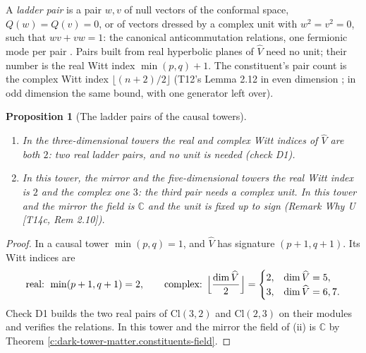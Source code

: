 \documentclass[11pt]{article}
\newtheorem{proposition}[theorem]{Proposition}
\theoremstyle{definition}
\theoremstyle{plain}
\newcommand{\changedmark}[2]{\marginpar{\raggedright\scriptsize\color{#1}#2}}
\providecommand{\C}{}\renewcommand{\C}{\mathbb{C}}
\providecommand{\Cl}{}\renewcommand{\Cl}{\mathrm{Cl}}
\providecommand{\hatV}{}\renewcommand{\hatV}{\widehat{V}}
\begin{document}
\label{c:note.dark-tower-matter.setting-ladder-pairs-complex-unit}
A \emph{ladder pair} is a pair $w, v$ of null vectors of the conformal space, $Q(w) = Q(v) = 0$, or of vectors dressed by a complex unit with $w^{2} = v^{2} = 0$, such that $wv + vw = 1$: the canonical anticommutation relations, one fermionic mode per pair \cite[Prop.~4.1]{ButlerT3}. Pairs built from real hyperbolic planes of $\hatV$ need no unit; their number is the real Witt index $\min(p,q) + 1$. The constituent's pair count is the complex Witt index $\lfloor (n+2)/2 \rfloor$ (T12's Lemma 2.12 in even dimension \cite[Lem.~2.12]{ButlerT12}; in odd dimension the same bound, with one generator left over).

\begin{proposition}[The ladder pairs of the causal towers]\label{c:dark-tower-matter.pairs}
\changedmark{BurntOrange}{changed since the deposit}
\begin{enumerate}
\item[(i)] In the three-dimensional towers the real and complex Witt indices of $\hatV$ are both $2$: two real ladder pairs, and no unit is needed (check D1).
\item[(ii)] In this tower, the mirror and the five-dimensional towers the real Witt index is $2$ and the complex one $3$: the third pair needs a complex unit. In this tower and the mirror the field is $\C$ and the unit is fixed up to sign (Remark \emph{Why U} [T14c, Rem 2.10]).
\end{enumerate}
\end{proposition}
\begin{proof}
In a causal tower $\min(p,q) = 1$, and $\hatV$ has signature $(p+1, q+1)$. Its Witt indices are
\[
\text{real: } \min(p+1, q+1) = 2, \qquad
\text{complex: } \Bigl\lfloor \frac{\dim\hatV}{2} \Bigr\rfloor =
\begin{cases} 2, & \dim\hatV = 5, \\ 3, & \dim\hatV = 6, 7. \end{cases}
\]
Check D1 builds the two real pairs of $\Cl(3,2)$ and $\Cl(2,3)$ on their modules and verifies the relations. In this tower and the mirror the field of (ii) is $\C$ by Theorem \ref{c:dark-tower-matter.constituents-field}.

\end{proof}
\end{document}
